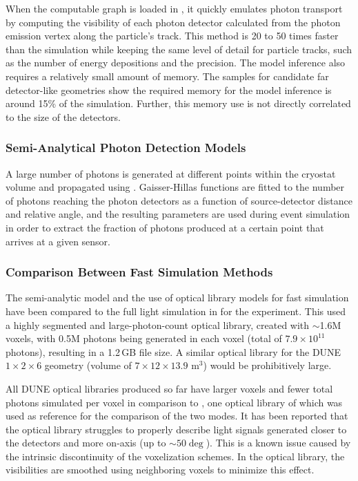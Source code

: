 \documentclass[../main-v1.tex]{subfiles}
\begin{document}
When the computable graph is loaded in , it quickly emulates photon transport by  computing the visibility %
 of each photon detector calculated from  the photon emission vertex along the particle's track.
This method is 20 to 50 times faster than the  simulation while keeping the same level of detail for particle tracks, such as the number of energy depositions and the precision.
The model inference also requires a relatively small amount of memory. The samples for candidate  %
far detector-like geometries show the required memory for the model inference is around 15\% of the  simulation. Further, this memory use is not directly correlated to the size of the detectors. %

\subsubsection{Semi-Analytical Photon Detection Models}
A large number of photons is generated at different points within the cryostat volume and propagated using . Gaisser-Hillas functions are fitted to the  number of 
photons reaching the photon detectors as a function of source-detector distance and relative angle, and the resulting parameters are used during event simulation  in order 
to extract the fraction of photons produced at a certain point that arrives at a given sensor.
 
\subsubsection{Comparison Between Fast Simulation Methods}
The semi-analytic model and the use of  optical library models for fast simulation have been compared to the full light simulation in  for the  experiment. This used a highly segmented and large-photon-count optical library, created with $\sim$1.6M voxels, with 0.5M photons being 
generated in each voxel (total of $7.9 \times  10^{11}$ photons), resulting in a  1.2\,GB file size. A similar optical library for the DUNE $1\times2\times6$ geometry (volume of $7 \times 12 \times 13.9$ m$^3$) would be prohibitively large.

All DUNE optical libraries produced so far have larger voxels and fewer total photons simulated per voxel 
in comparison to  , one optical library of which 
was used as reference for the comparison of the two modes.
It has been reported that the optical library struggles to properly describe light signals generated closer to the detectors and more on-axis (up to $\sim50\deg$). This is a known issue caused by the intrinsic discontinuity of the voxelization schemes. In the  optical library, the visibilities are smoothed using neighboring voxels  to minimize this effect. 
\end{document}
